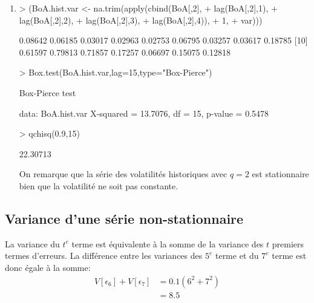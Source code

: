 \documentclass{article}
\begin{document}
\begin{enumerate}
\item
\begin{Schunk}
\begin{Sinput}
> (BoA.hist.var <- na.trim(apply(cbind(BoA[,2],
+                                      lag(BoA[,2],1),
+                                      lag(BoA[,2],2),
+                                      lag(BoA[,2],3),
+                                      lag(BoA[,2],4)),
+                                1,
+                                var)))
\end{Sinput}
\begin{Soutput}
 [1] 0.08642 0.06185 0.03017 0.02963 0.02753 0.06795 0.03257 0.03617 0.18785
[10] 0.61597 0.79813 0.71857 0.17257 0.06697 0.15075 0.12818
\end{Soutput}
\begin{Sinput}
> Box.test(BoA.hist.var,lag=15,type="Box-Pierce")
\end{Sinput}
\begin{Soutput}
	Box-Pierce test

data:  BoA.hist.var
X-squared = 13.7076, df = 15, p-value = 0.5478
\end{Soutput}
\begin{Sinput}
> qchisq(0.9,15)
\end{Sinput}
\begin{Soutput}
[1] 22.30713
\end{Soutput}
\end{Schunk}

On remarque que la série des volatilités historiques avec $q=2$ est stationnaire bien que la volatilité ne soit pas constante.
  
\end{enumerate}

\clearpage
\subsection{Variance d'une série non-stationnaire}

La variance du $t^e$ terme est équivalente à la somme de la variance des $t$ premiers termes d'erreurs. La différence entre les variances des $5^e$ terme et du $7^e$ terme est donc égale à la somme:
\begin{align*}
  \label{eq:2}
  V\left[\epsilon_6\right]+V\left[\epsilon_7\right] &= 0.1(6^2+7^2) \\
  & = 8.5
\end{align*}

\clearpage


\end{document}
